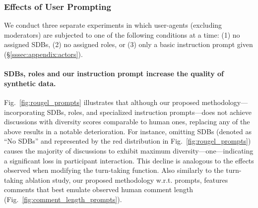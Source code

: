 \subsubsection{Effects of User Prompting}

We conduct three separate experiments in which user-agents (excluding moderators) are subjected to one of the following conditions at a time: (1) no assigned \acp{SDB}, (2) no assigned roles, or (3) only a basic instruction prompt given (\S\ref{sssec:appendix:actors}). 

\paragraph{\acp{SDB}, roles and our instruction prompt increase the quality of synthetic data.} Fig.~\ref{fig:rougel_prompts} illustrates that although our proposed methodology---incorporating \acp{SDB}, roles, and specialized instruction prompts---does not achieve discussions with diversity scores comparable to human ones, replacing any of the above results in a notable deterioration. For instance, omitting \acp{SDB} (denoted as ``No \acp{SDB}'' and represented by the red distribution in Fig.~\ref{fig:rougel_prompts}) causes the majority of discussions to exhibit maximum diversity---one---indicating a significant loss in participant interaction. This decline is analogous to the effects observed when modifying the turn-taking function. Also similarly to the turn-taking ablation study, our proposed methodology w.r.t. prompts, features comments that best emulate observed human comment length (Fig.~\ref{fig:comment_length_prompts}).